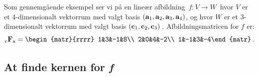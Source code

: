 Som gennemgående eksempel ser vi på en lineær afbildning $\,f:V \rightarrow W\,$ hvor $V$ er et 4-dimensionalt vektorrum med  valgt basis $(\mathbf{a}_1,\mathbf{a}_2,\mathbf{a}_3,\mathbf{a}_4)$, og hvor $W$ er et 3-dimensionalt vektorrum med valgt basis $(\mathbf{c}_1,\mathbf{c}_2,\mathbf{c}_3)\,$. Afbildningsmatricen for $f$ er:
\begin{equation}\label{tn8.exBrugAfbM}
\matind cFa=
\begin{matr}{rrrr}
1&3&-1&8\\
2&0&4&-2\\
1&-1&3&-4\end{matr}\,.
\end{equation}

\subsection{At finde kernen for \textit{f}}

